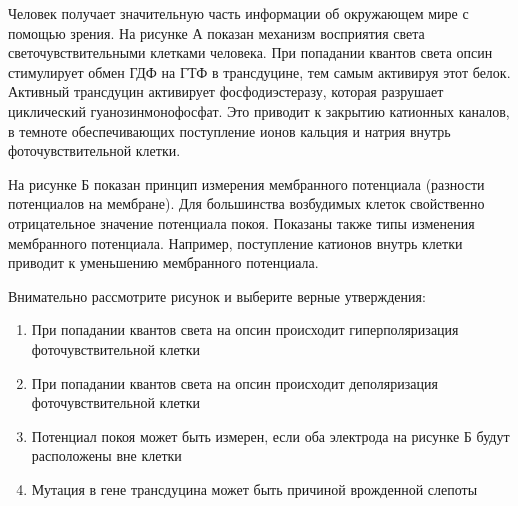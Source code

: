 
Человек
получает значительную часть информации об окружающем мире с помощью зрения. На
рисунке А показан механизм восприятия света светочувствительными клетками
человека. При попадании квантов света опсин стимулирует обмен ГДФ на ГТФ в
трансдуцине, тем самым активируя этот белок. Активный трансдуцин активирует
фосфодиэстеразу, которая разрушает циклический гуанозинмонофосфат. Это приводит
к закрытию катионных каналов, в темноте обеспечивающих поступление ионов
кальция и натрия внутрь фоточувствительной клетки.

На рисунке Б показан принцип измерения мембранного потенциала (разности
потенциалов на мембране). Для большинства возбудимых клеток свойственно
отрицательное значение потенциала покоя. Показаны также типы изменения
мембранного потенциала. Например, поступление катионов внутрь клетки приводит к
уменьшению мембранного потенциала.


Внимательно рассмотрите
рисунок и выберите верные утверждения:

\begin{enumerate}
    \item При попадании квантов света на опсин происходит гиперполяризация фоточувствительной клетки
    \item При попадании квантов света на опсин происходит деполяризация фоточувствительной клетки
    \item Потенциал покоя может быть измерен, если оба электрода на рисунке Б будут расположены вне клетки
    \item Мутация в гене трансдуцина может быть причиной врожденной слепоты
\end{enumerate}

